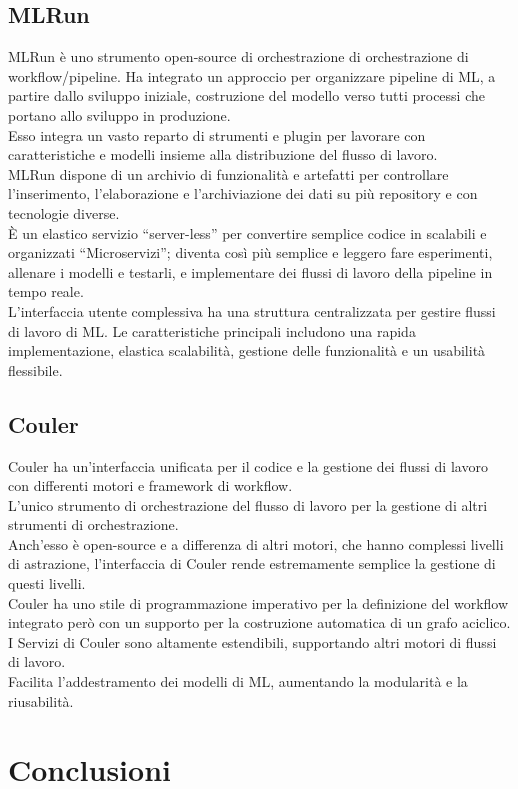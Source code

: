 \documentclass[../tesi.tex]{subfiles}
\begin{document}
\subsection{MLRun}
MLRun è uno strumento open-source di orchestrazione di orchestrazione di workflow/pipeline. Ha integrato un approccio per organizzare pipeline di ML, a partire dallo sviluppo iniziale, costruzione del modello verso tutti processi che portano allo sviluppo in produzione.\\
Esso integra un vasto reparto di strumenti e plugin per lavorare con caratteristiche e modelli insieme alla distribuzione del flusso di lavoro.\\
MLRun dispone di un archivio di funzionalità e artefatti per controllare l’inserimento, l’elaborazione e l’archiviazione dei dati su più repository e con tecnologie diverse.\\
È un elastico servizio ``\Gls{server-less}'' per convertire semplice codice in scalabili e organizzati ``\Gls{Microservizi}''; diventa così più semplice e leggero fare esperimenti, allenare i modelli e testarli, e implementare dei flussi di lavoro della pipeline in tempo reale.\\
L’interfaccia utente complessiva ha una struttura centralizzata per gestire flussi di lavoro di ML. Le caratteristiche principali includono una rapida implementazione, elastica scalabilità, gestione delle funzionalità e un usabilità flessibile.\\


\subsection{Couler}
Couler ha un’interfaccia unificata per il codice e la gestione dei flussi di lavoro con differenti motori e framework di workflow.\\
L'unico strumento di orchestrazione del flusso di lavoro per la gestione di altri strumenti di orchestrazione.\\
Anch’esso è open-source e a differenza di altri motori, che hanno complessi livelli di astrazione, l’interfaccia di Couler rende estremamente semplice la gestione di questi livelli.\\
Couler ha uno stile di programmazione imperativo per la definizione del workflow integrato però con un supporto per la costruzione automatica di un \Gls{grafo aciclico}.\\
I Servizi di Couler sono altamente estendibili, supportando altri motori di flussi di lavoro.\\
Facilita l’addestramento dei modelli di ML, aumentando la modularità e la riusabilità.

\section{Conclusioni}
\end{document}
